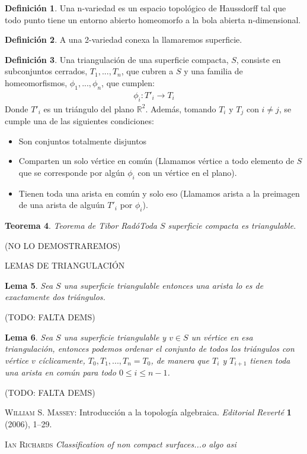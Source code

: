 \documentclass[a4paper,11pt,spanish, twoside, leqno]{tfg-uam}
\newtheorem{teor}{Teorema}[chapter]
\newtheorem{lema}[teor]{Lema}
\theoremstyle{definition}
\newtheorem{defin}[teor]{Definici\'on}
\begin{document}
\begin{defin}
	Una n-variedad es un espacio topológico de Haussdorff tal que todo punto tiene un entorno abierto homeomorfo a la bola abierta n-dimensional.
\end{defin}

\begin{defin}
	A una 2-variedad conexa la llamaremos superficie.
\end{defin}

\begin{defin}
	Una triangulación de una superficie compacta, $S$, consiste en subconjuntos cerrados, ${T_1, ..., T_n}$, que cubren a $S$ y una familia de homeomorfismos, ${\phi_1, ..., \phi_n}$, que cumplen:
	\begin{align*}
	\phi_i: T'_i \longrightarrow T_i
	\end{align*}
	Donde $T'_i$ es un triángulo del plano $\mathbb{R}^2$. Además, tomando $T_i$ y $T_j$ con $i\neq j$, se cumple una de las siguientes condiciones:
	\begin{itemize}
		\item 
		Son conjuntos totalmente disjuntos
		\item 
		Comparten un solo vértice en común (Llamamos vértice a todo elemento de $S$ que se corresponde por algún $\phi_i$ con un vértice en el plano).
		\item 
		Tienen toda una arista en común y solo eso (Llamamos arista a la preimagen de una arista de alguún $T'_i$ por $\phi_i$).
	\end{itemize}
	
\end{defin}

\begin{teor}{Teorema de Tibor Radó}\label{teoremaDeTriangulacion}
	Toda $S$ superficie compacta es triangulable.
\end{teor}(NO LO DEMOSTRAREMOS)

LEMAS DE TRIANGULACIÓN
\begin{lema}\label{lema1detriangulacion}
	Sea $S$ una superficie triangulable entonces una arista lo es de exactamente dos triángulos.
\end{lema}(TODO: FALTA DEMS)

\begin{lema}\label{lema2detriangulacion}
	Sea  $S$ una superficie triangulable y $v\in S$ un vértice en esa triangulación, entonces podemos ordenar el conjunto de todos los triángulos con vértice $v$ cíclicamente,  $T_0, T_1, ..., T_n = T_0$, de manera que $T_i$ y $T_{i+1}$ tienen toda una arista en común para todo $0\leq i\leq n-1$.
\end{lema}(TODO: FALTA DEMS)


\begin{thebibliography}{10}

    \textsc{William S. Massey}: 
    Introducción a la topología algebraica. 
    \textit{Editorial Reverté} {\bf1} (2006), 1--29.

    \textsc{Ian Richards}
    \textit{Classification of non compact surfaces...o algo asi}
    
    
\end{thebibliography}
\cleardoublepage
\end{document}
